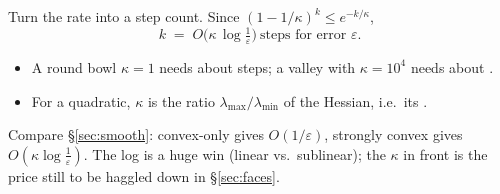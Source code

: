 \begin{yourturn}
Turn the rate into a step count. Since $(1-1/\kappa)^k\le e^{-k/\kappa}$,
\[
  k\;=\;O\!\big(\kappa\,\log\tfrac1\varepsilon\big)\ \text{steps for error }\varepsilon.
\]
\begin{itemize}[leftmargin=1.3em,itemsep=1pt]
  \item A round bowl $\kappa=1$ needs about \fillin[2cm] steps; a valley with $\kappa=10^4$ needs about \fillin[1.6cm].
  \item For a quadratic, $\kappa$ is the ratio $\lambda_{\max}/\lambda_{\min}$ of the Hessian, i.e.\ its \fillin[3cm].
\end{itemize}
\end{yourturn}

\begin{strand}
Compare §\ref{sec:smooth}: convex-only gives $O(1/\varepsilon)$, strongly convex gives
$O(\kappa\log\tfrac1\varepsilon)$. The log is a huge win (linear vs.\ sublinear); the $\kappa$ in
front is the price still to be haggled down in §\ref{sec:faces}.
\end{strand}
